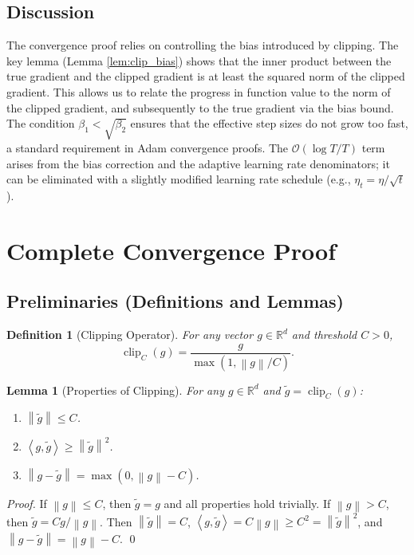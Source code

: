 \documentclass{article}
\newtheorem{lemma}{Lemma}
\newtheorem{definition}{Definition}
\newcommand{\R}{\mathbb{R}}
\newcommand{\norm}[1]{\left\| #1 \right\|}
\newcommand{\inner}[2]{\left\langle #1, #2 \right\rangle}
\newcommand{\clip}[2]{\operatorname{clip}_{#1}(#2)}
\begin{document}
\subsection*{Discussion}
The convergence proof relies on controlling the bias introduced by clipping. The key lemma (Lemma \ref{lem:clip_bias}) shows that the inner product between the true gradient and the clipped gradient is at least the squared norm of the clipped gradient. This allows us to relate the progress in function value to the norm of the clipped gradient, and subsequently to the true gradient via the bias bound. The condition $\beta_1 < \sqrt{\beta_2}$ ensures that the effective step sizes do not grow too fast, a standard requirement in Adam convergence proofs. The $\mathcal{O}(\log T / T)$ term arises from the bias correction and the adaptive learning rate denominators; it can be eliminated with a slightly modified learning rate schedule (e.g., $\eta_t = \eta/\sqrt{t}$).

\section*{Complete Convergence Proof}

\subsection*{Preliminaries (Definitions and Lemmas)}

\begin{definition}[Clipping Operator]
    For any vector $g \in \R^d$ and threshold $C > 0$,
    \[
        \clip{C}{g} = \frac{g}{\max(1, \norm{g}/C)}.
    \]
\end{definition}

\begin{lemma}[Properties of Clipping] \label{lem:clip}
    For any $g \in \R^d$ and $\tilde{g} = \clip{C}{g}$:
    \begin{enumerate}
        \item $\norm{\tilde{g}} \le C$.
        \item $\inner{g}{\tilde{g}} \ge \norm{\tilde{g}}^2$.
        \item $\norm{g - \tilde{g}} = \max(0, \norm{g} - C)$.
    \end{enumerate}
\end{lemma}
\begin{proof}
    If $\norm{g} \le C$, then $\tilde{g}=g$ and all properties hold trivially. If $\norm{g} > C$, then $\tilde{g} = C g / \norm{g}$. Then $\norm{\tilde{g}} = C$, $\inner{g}{\tilde{g}} = C \norm{g} \ge C^2 = \norm{\tilde{g}}^2$, and $\norm{g-\tilde{g}} = \norm{g} - C$. \qed
\end{proof}
\end{document}
